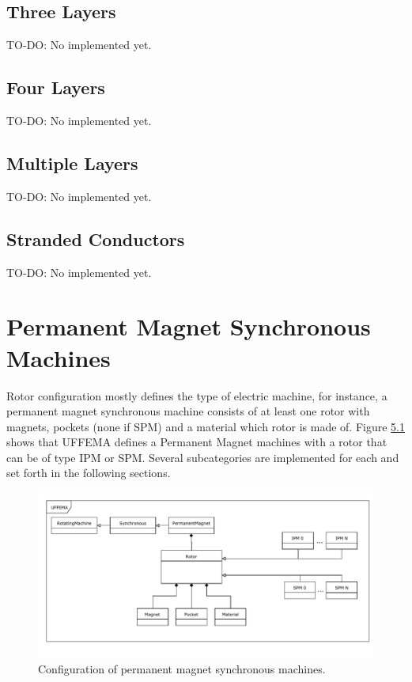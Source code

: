 \documentclass[justified]{tufte-book} %
\begin{document}
\section[Three Layers]{Three Layers}
TO-DO: No implemented yet.

\section[Four Layers]{Four Layers}
TO-DO: No implemented yet.

\section[Multiple Layers]{Multiple Layers}
TO-DO: No implemented yet.

\section[Stranded Conductors]{Stranded Conductors}
TO-DO: No implemented yet.


\chapter{Permanent Magnet Synchronous Machines}
\label{ch:pmsm}
\begin{fullwidth}
Rotor configuration mostly defines the type of electric machine, for instance, a permanent magnet synchronous machine consists of at least one rotor with magnets, pockets (none if SPM) and a material which rotor is made of. Figure \ref{fig:pmsm} shows that UFFEMA defines a Permanent Magnet machines with a rotor that can be of type IPM or SPM. Several subcategories are implemented for each and set forth in the following sections. 
\end{fullwidth}

\begin{figure}[h]
\includegraphics[width=\linewidth]{Rotor_PermanentMagnet.pdf}
\caption{Configuration of permanent magnet synchronous machines.}
\label{fig:pmsm}
\end{figure}
\end{document}
